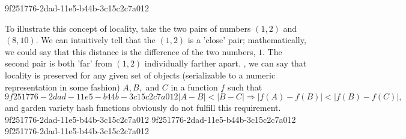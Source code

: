 \documentclass[12pt]{article}
\begin{document}
9f251776-2dad-11e5-b44b-3c15c2c7a012\par To illustrate this concept of locality, take the two pairs of numbers $(1,2)$ and $(8,10)$. We can intuitively tell that the $(1,2)$ is a 'close' pair; mathematically, we could say that this distance is the difference of the two numbers, $1$. The second pair is both 'far' from $(1,2)$ individually farther apart. , we can say that locality is preserved for any given set of objects (serializable to a numeric representation in some fashion) $A,B,$ and $C$ in a function $f$ such that
\begin{equation}
9f251776-2dad-11e5-b44b-3c15c2c7a012|A-B| < |B-C| \Rightarrow |f(A)-f(B)| < |f(B) - f(C)|,
\end{equation}
and garden variety hash functions obviously do not fulfill this requirement.
9f251776-2dad-11e5-b44b-3c15c2c7a012
9f251776-2dad-11e5-b44b-3c15c2c7a012\printbibliography
9f251776-2dad-11e5-b44b-3c15c2c7a012
\end{document}
